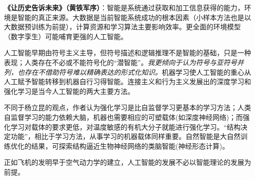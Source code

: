 \par \textbf{《让历史告诉未来》（黄铁军序）}：智能是系统通过获取和加工信息获得的能力，环境是智能的真正来源。大数据是当前智能系统成功的根本因素（小样本方法也是以大数据预训练为前提），计算资源和学习算法主要影响效率。更全面的环境模型（数字孪生）可能哺育更强的人工智能。
\par 人工智能早期由符号主义主导，但符号描述和逻辑推理不是智能的基础，只是一种表现；人类存在不必或不能符号化的“潜智能”。\emph{我更倾向于认为符号与亚符号并列，也存在不借助符号难以精确表达的形式化知识。}机器学习使人工智能的重心从人工赋予智能转移到机器自行习得智能。连接主义和行为主义发展出的深度学习和强化学习是当今人工智能的两大主要方法。
\par 不同于杨立昆的观点，作者认为强化学习是比自监督学习更基本的学习方法；人类自监督学习的能力依赖大脑，机器也需要相应的可塑载体(如深度神经网络)；而强化学习对载体的要求更低，对温度敏感的有机大分子就能进行强化学习。“结构决定功能”，相比于学习方法，从事学习的机器载体同样重要。自然智能是大自然训练优化的结果，可探索结构逼近生物神经网络的类脑智能(神经形态计算)。
\par 正如飞机的发明早于空气动力学的建立，人工智能的发展不必以智能理论的发展为前提。